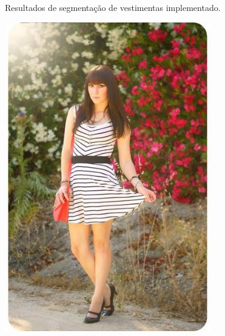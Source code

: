 \documentclass[12pt]{report}
\begin{document}
\begin{figure}
\begin{minipage}[b]{0.3\textwidth}
  \end{minipage}
  \caption{Resultados de segmentação de vestimentas implementado.}
  \label{fig:moda-seg}
\end{figure}

\begin{figure}
  \centering
  \begin{minipage}[b]{0.48\textwidth}
    \includegraphics[width=0.8\textwidth]{images/resultados/490842original.jpg}
  \end{minipage}
  \hfill
  \begin{minipage}[b]{0.48\textwidth}

\end{minipage}
\end{figure}
\end{document}
